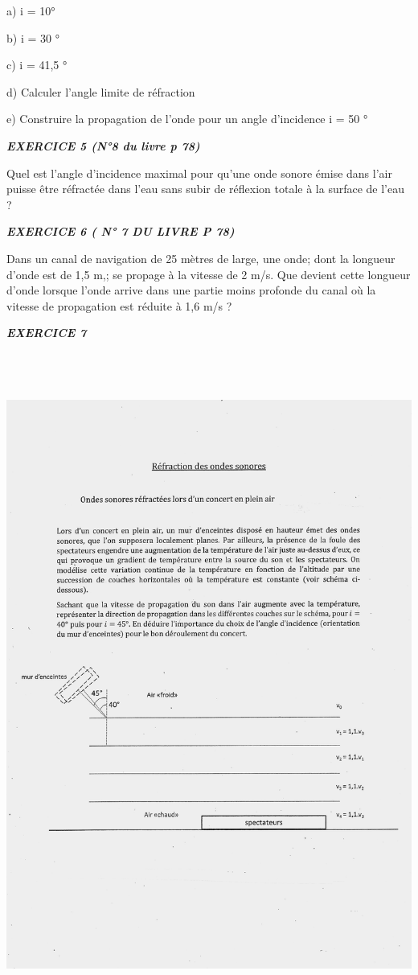a) i = 10°

b) i = 30 °

c) i = 41,5 °

d) Calculer l'angle limite de réfraction

e) Construire la propagation de l'onde pour un angle d'incidence i = 50
°

\emph{\textbf{EXERCICE 5 (N°8 du livre p 78) }}

Quel est l'angle d'incidence maximal pour qu'une onde sonore émise dans
l'air puisse être réfractée dans l'eau sans subir de réflexion totale à
la surface de l'eau ?

\emph{\textbf{EXERCICE 6 ( N° 7 DU LIVRE P 78)}}

Dans un canal de navigation de 25 mètres de large, une onde; dont la
longueur d'onde est de 1,5 m,; se propage à la vitesse de 2 m/s. Que
devient cette longueur d'onde lorsque l'onde arrive dans une partie
moins profonde du canal où la vitesse de propagation est réduite à 1,6
m/s ?

\emph{\textbf{EXERCICE 7}}

\includegraphics[width=18.501cm,height=21.812cm]{Pictures/100000010000133200001AE8CBE600732ABF4D48.png}

